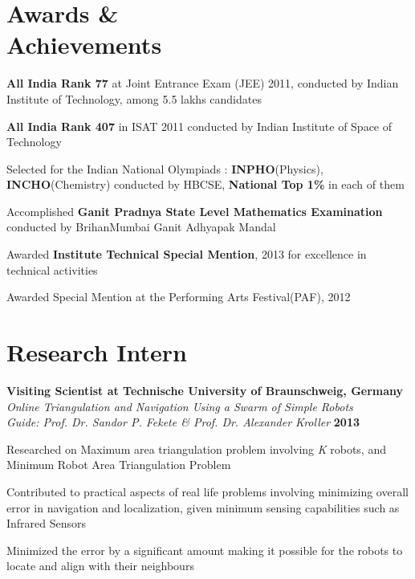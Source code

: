 \documentclass[margin,11pt]{resume}
\begin{document}
\begin{resume}

\vspace{45mm}

\section{\mysidestyle Awards \&\\ Achievements}

\begin{list2}
\item \textbf {All India Rank 77} at Joint Entrance Exam (JEE) 2011, conducted by Indian Institute of Technology, among 5.5 lakhs candidates 
\item \textbf {All India Rank 407} in ISAT 2011 conducted by Indian Institute of Space of Technology 
\item Selected for the Indian National Olympiads : \textbf{INPHO}(Physics), \textbf{INCHO}(Chemistry) conducted by HBCSE, \textbf{National Top 1\%} in each of them
\item Accomplished \textbf {Ganit Pradnya State Level Mathematics Examination} conducted by BrihanMumbai Ganit Adhyapak Mandal
\item Awarded \textbf{Institute Technical Special Mention}, 2013 for excellence in technical activities
\item Awarded Special Mention at the Performing Arts Festival(PAF), 2012
				
\vspace{-3mm}
\end{list2}\vspace{0.25mm}

\section{\mysidestyle Research Intern}
				\textbf{Visiting Scientist at  Technische University of Braunschweig, Germany\\} \emph{Online Triangulation and Navigation Using a Swarm of Simple Robots}\\
				\emph{Guide: Prof. Dr. Sandor P. Fekete \& Prof. Dr. Alexander Kroller} \hfill {\textbf{2013}} \vspace{-4mm}\\
				\begin{list2}	
				\item Researched on Maximum area triangulation problem involving \emph{K} robots, and Minimum Robot Area Triangulation Problem
				\item Contributed to practical aspects of real life problems involving minimizing overall error in navigation and localization, given minimum sensing capabilities such as Infrared Sensors  
				\item Minimized the error by a significant amount making it possible for the robots to locate and align with their neighbours
				\end{list2}
\vspace{-3mm}

\end{resume}
\end{document}
